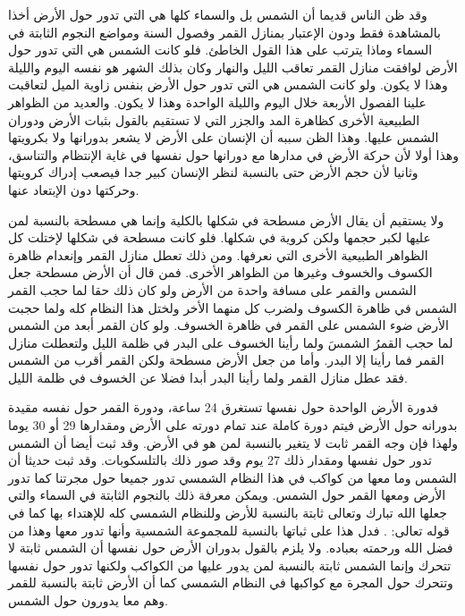 وقد ظن الناس قديما أن الشمس بل والسماء كلها هي التي تدور حول الأرض أخذا بالمشاهدة فقط ودون الإعتبار بمنازل القمر وفصول السنة ومواضع النجوم الثابتة في السماء وماذا يترتب على هذا القول الخاطئ. فلو كانت الشمس هي التي تدور حول الأرض لوافقت منازل القمر تعاقب الليل والنهار وكان بذلك الشهر هو نفسه اليوم والليلة وهذا لا يكون. ولو كانت الشمس هي التي تدور حول الأرض بنفس زاوية الميل لتعاقبت علينا الفصول الأربعة خلال اليوم والليلة الواحدة وهذا لا يكون. والعديد من الظواهر الطبيعية الأخرى كظاهرة المد والجزر التي لا تستقيم بالقول بثبات الأرض ودوران الشمس عليها. وهذا الظن سببه أن الإنسان على الأرض لا يشعر بدورانها ولا بكرويتها وهذا أولا لأن حركة الأرض في مدارها مع دورانها حول نفسها في غاية الإنتظام والتناسق، وثانيا لأن حجم الأرض حتى بالنسبة لنظر الإنسان كبير جدا فيصعب إدراك كرويتها وحركتها دون الإبتعاد عنها.

ولا يستقيم أن يقال الأرض مسطحة في شكلها بالكلية وإنما هي مسطحة بالنسبة لمن عليها لكبر حجمها ولكن كروية في شكلها. فلو كانت مسطحة في شكلها لإختلت كل الظواهر الطبيعية الأخرى التي نعرفها. ومن ذلك تعطل منازل القمر وإنعدام ظاهرة الكسوف والخسوف وغيرها من الظواهر الأخرى. فمن قال أن الأرض مسطحة جعل الشمس والقمر على مسافة واحدة من الأرض ولو كان ذلك حقا لما حجب القمر الشمس في ظاهرة الكسوف ولضرب كل منهما الأخر ولختل هذا النظام كله ولما حجبت الأرض ضوء الشمس على القمر في ظاهرة الخسوف. ولو كان القمر أبعد من الشمس لما حجب القمرُ الشمسَ ولما رأينا الخسوف على البدر في ظلمة الليل ولتعطلت منازل القمر فما رأينا إلا البدر. وأما من جعل الأرض مسطحة ولكن القمر أقرب من الشمس فقد عطل منازل القمر ولما رأينا البدر أبدا فضلا عن الخسوف في ظلمة الليل.

فدورة الأرض الواحدة حول نفسها تستغرق 24 ساعة، ودورة القمر حول نفسه مقيدة بدورانه حول الأرض فيتم دورة كاملة عند تمام دورته على الأرض ومقدارها 29 أو 30 يوما ولهذا فإن وجه القمر ثابت لا يتغير بالنسبة لمن هو في الأرض. وقد ثبت أيضا أن الشمس تدور حول نفسها ومقدار ذلك 27 يوم وقد صور ذلك بالتلسكوبات. وقد ثبت حديثا أن الشمس وما معها من كواكب في هذا النظام الشمسي تدور جميعا حول مجرتنا كما تدور الأرض ومعها القمر حول الشمس. ويمكن معرفة ذلك بالنجوم الثابتة في السماء والتي جعلها الله تبارك وتعالى ثابتة بالنسبة للأرض وللنظام الشمسي كله للإهتداء بها كما في قوله تعالى: \quranayah*[6][97]{\footnotesize (\surahname*[6])}. فدل هذا على ثباتها بالنسبة للمجموعة الشمسية وأنها تدور معها وهذا من فضل الله ورحمته بعباده. ولا يلزم بالقول بدوران الأرض حول نفسها أن الشمس ثابتة لا تتحرك وإنما الشمس ثابتة بالنسبة لمن يدور عليها من الكواكب ولكنها تدور حول نفسها وتتحرك حول المجرة مع كواكبها في النظام الشمسي كما أن الأرض ثابتة بالنسبة للقمر وهم معا يدورون حول الشمس.

